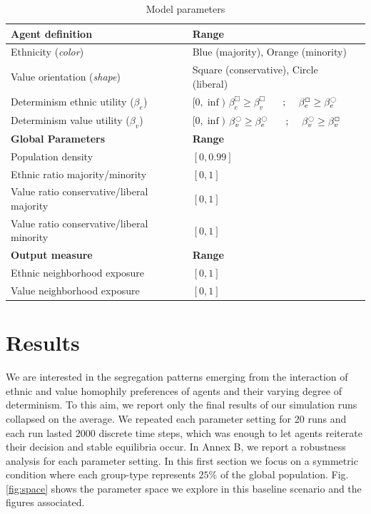 \documentclass{article}
\begin{document}
\begin{table}[H]

\begin{tabular}{lll}
 \hline
\textbf{Agent definition}  & \textbf{Range}    \\ 
 \hline
 Ethnicity  (\textit{color})         & Blue (majority), Orange (minority)  \\
 Value orientation (\textit{shape}) & Square (conservative), Circle (liberal) \\
 Determinism ethnic utility ($\beta_e$) & $[0,\inf)$ 
 $\beta^{\Box}_e \geq \beta^{\Box}_v$
 $\quad\text{   ;    }\quad \beta^{\Box}_e \geq \beta^{\ocircle}_e$
 \\
 Determinism value utility ($\beta_v$) & $[0,\inf)$ $\beta^{\ocircle}_v \geq \beta^{\ocircle}_e$
 $\quad\text{   ;    }\quad \beta^{\ocircle}_v \geq \beta^{\Box}_v$\\
 \hline
\textbf{Global Parameters}  & \textbf{Range} \\ 
\hline 
 Population density      & $[0,0.99]$ \\
 Ethnic ratio majority/minority &  $[0,1]$ \\
 Value ratio conservative/liberal majority & $[0,1]$ \\
 Value ratio conservative/liberal minority  & $[0,1]$ \\
 \hline
 \textbf{Output measure}  & \textbf{Range} \\ 
\hline 
 Ethnic neighborhood exposure      & $[0,1]$ \\
 Value neighborhood exposure       & $[0,1]$ \\
 \hline
\end{tabular}
 \caption{Model parameters} 
 \label{tab:parameters}
\end{table}


\section*{Results}

We are interested in the segregation patterns emerging from the interaction of ethnic and value homophily preferences of agents and their varying degree of determinism. To this aim, we report only the final results of our simulation runs collapsed on the average. We repeated each parameter setting for 20 runs and each run lasted 2000 discrete time steps, which was enough to let agents reiterate their decision and stable equilibria occur. In Annex B, we report a robustness analysis for each parameter setting. In this first section we focus on a symmetric condition where each group-type %
represents $25 \%$ of the global population. Fig. \ref{fig:space} shows the parameter space we explore in this baseline scenario and the figures associated. 
\end{document}
